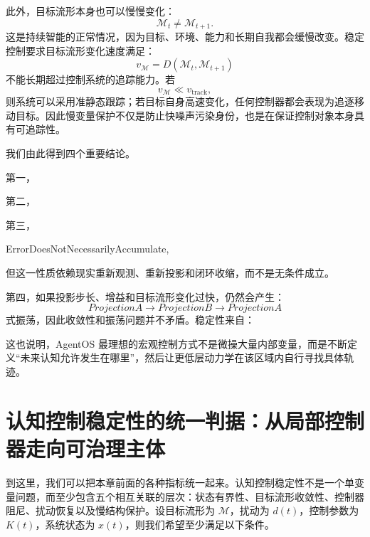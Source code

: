 此外，目标流形本身也可以慢慢变化：
\[
\mathcal M_t
\neq
\mathcal M_{t+1}.
\]
这是持续智能的正常情况，因为目标、环境、能力和长期自我都会缓慢改变。稳定控制要求目标流形变化速度满足：
\[
v_{\mathcal M}
=
D
\left(
\mathcal M_t,
\mathcal M_{t+1}
\right)
\]
不能长期超过控制系统的追踪能力。若
\[
v_{\mathcal M}
\ll
v_{\mathrm{track}},
\]
则系统可以采用准静态跟踪；若目标自身高速变化，任何控制器都会表现为追逐移动目标。因此慢变量保护不仅是防止快噪声污染身份，也是在保证控制对象本身具有可追踪性。

我们由此得到四个重要结论。

第一，
\begin{statementbox}
\centering
{}
\end{statementbox}

第二，
\begin{statementbox}
\centering
{}
\end{statementbox}

第三，
\begin{statementbox}
ErrorDoesNotNecessarilyAccumulate,
\end{statementbox}
但这一性质依赖现实重新观测、重新投影和闭环收缩，而不是无条件成立。

第四，如果投影步长、增益和目标流形变化过快，仍然会产生：
\[
ProjectionA
\rightarrow
ProjectionB
\rightarrow
ProjectionA
\]
式振荡，因此收敛性和振荡问题并不矛盾。稳定性来自：
\begin{statementbox}
\centering
{}
\end{statementbox}

这也说明，AgentOS 最理想的宏观控制方式不是微操大量内部变量，而是不断定义“未来认知允许发生在哪里”，然后让更低层动力学在该区域内自行寻找具体轨迹。

\section{认知控制稳定性的统一判据：从局部控制器走向可治理主体}

到这里，我们可以把本章前面的各种指标统一起来。认知控制稳定性不是一个单变量问题，而至少包含五个相互关联的层次：状态有界性、目标流形收敛性、控制器阻尼、扰动恢复以及慢结构保护。设目标流形为 $\mathcal M$，扰动为 $d(t)$，控制参数为 $K(t)$，系统状态为 $x(t)$，则我们希望至少满足以下条件。

